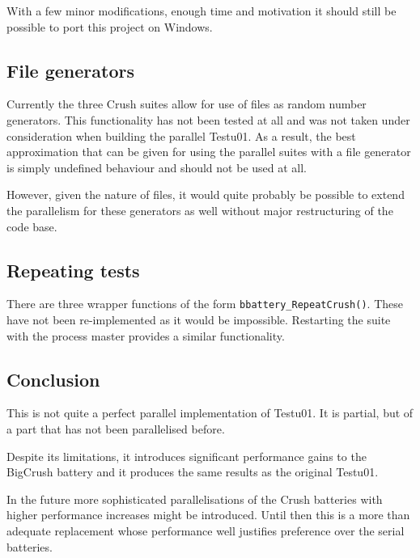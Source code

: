 With a few minor modifications, enough time and motivation it should still be possible to port this project on Windows.

\subsection{File generators}
Currently the three Crush suites allow for use of files as random number generators. This functionality has not been tested at all and was not taken under consideration when building the parallel Testu01. As a result, the best approximation that can be given for using the parallel suites with a file generator is simply undefined behaviour and should not be used at all.

However, given the nature of files, it would quite probably be possible to extend the parallelism for these generators as well without major restructuring of the code base.

\subsection{Repeating tests}
There are three wrapper functions of the form \texttt{bbattery\_RepeatCrush()}. These have not been re-implemented as it would be impossible. Restarting the suite with the process master provides a similar functionality.

\subsection{Conclusion}
This is not quite a perfect parallel implementation of Testu01. It is partial, but of a part that has not been parallelised before.

Despite its limitations, it introduces significant performance gains to the BigCrush battery and it produces the same results as the original Testu01.

In the future more sophisticated parallelisations of the Crush batteries with higher performance increases might be introduced. Until then this is a more than adequate replacement whose performance well justifies preference over the serial batteries.
